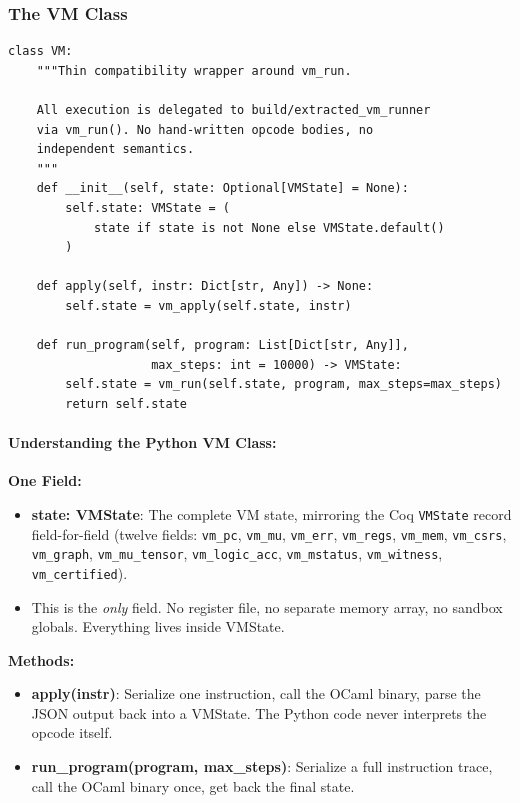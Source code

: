 \subsubsection{The VM Class}

\begin{lstlisting}
class VM:
    """Thin compatibility wrapper around vm_run.

    All execution is delegated to build/extracted_vm_runner
    via vm_run(). No hand-written opcode bodies, no
    independent semantics.
    """
    def __init__(self, state: Optional[VMState] = None):
        self.state: VMState = (
            state if state is not None else VMState.default()
        )

    def apply(self, instr: Dict[str, Any]) -> None:
        self.state = vm_apply(self.state, instr)

    def run_program(self, program: List[Dict[str, Any]],
                    max_steps: int = 10000) -> VMState:
        self.state = vm_run(self.state, program, max_steps=max_steps)
        return self.state
\end{lstlisting}

\paragraph{Understanding the Python VM Class:}
\textbf{One Field:}
\begin{itemize}
    \item \textbf{state: VMState}: The complete VM state, mirroring the Coq \texttt{VMState} record field-for-field (twelve fields: \texttt{vm\_pc}, \texttt{vm\_mu}, \texttt{vm\_err}, \texttt{vm\_regs}, \texttt{vm\_mem}, \texttt{vm\_csrs}, \texttt{vm\_graph}, \texttt{vm\_mu\_tensor}, \texttt{vm\_logic\_acc}, \texttt{vm\_mstatus}, \texttt{vm\_witness}, \texttt{vm\_certified}).
    \item This is the \emph{only} field. No register file, no separate memory array, no sandbox globals. Everything lives inside VMState.
\end{itemize}

\textbf{Methods:}
\begin{itemize}
    \item \textbf{apply(instr)}: Serialize one instruction, call the OCaml binary, parse the JSON output back into a VMState. The Python code never interprets the opcode itself.
    \item \textbf{run\_program(program, max\_steps)}: Serialize a full instruction trace, call the OCaml binary once, get back the final state.
\end{itemize}

